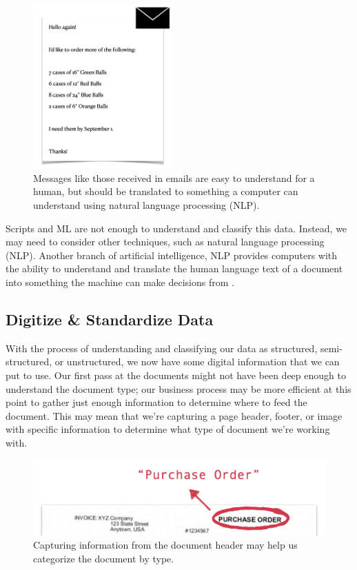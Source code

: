 \documentclass[conference]{IEEEtran}
\begin{document}
\begin{figure}[ht]
\centerline{\includegraphics[width=150pt]{UnstructuredEmailExample.png}}
\caption{Messages like those received in emails are easy to understand for a human, but should be translated to something a computer can understand using natural language processing (NLP).}
\label{figUnstructuredEmailExample}
\end{figure}

Scripts and ML are not enough to understand and classify this data. Instead, we may need to consider other techniques, such as natural language processing (NLP). Another branch of artificial intelligence, NLP provides computers with the ability to understand and translate the human language text of a document into something the machine can make decisions from \cite{ibm:nlp}.

\subsection{Digitize \& Standardize Data}
With the process of understanding and classifying our data as structured, semi-structured, or unstructured, we now have some digital information that we can put to use. Our first pass at the documents might not have been deep enough to understand the document type; our business process may be more efficient at this point to gather just enough information to determine where to feed the document. This may mean that we're capturing a page header, footer, or image with specific information to determine what type of document we're working with. 

\begin{figure}[ht]
\centerline{\includegraphics[width=\columnwidth]{DocumentHeader.png}}
\caption{Capturing information from the document header may help us categorize the document by type.}
\label{figDocumentHeader}
\end{figure}
\end{document}

